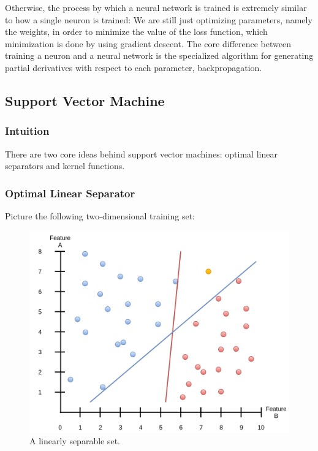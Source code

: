\documentclass[a4paper, 12pt]{article}
\begin{document}
                        \par Otherwise, the process by which a neural network is trained is extremely similar to how a single neuron is trained: We are still just optimizing parameters, namely the weights, in order to minimize the value of the loss function, which minimization is done by using gradient descent. The core difference between training a neuron and a neural network is the specialized algorithm for generating partial derivatives with respect to each parameter, backpropagation.
                        
                      
                \newpage                  
                \subsection{Support Vector Machine}
                
                    \subsubsection{Intuition}
                    
                        \par There are two core ideas behind support vector machines: optimal linear separators and kernel functions.
                        
                    \subsubsection{Optimal Linear Separator}
                    
                        \par Picture the following two-dimensional training set:
                        
                        \begin{figure}[h]
                            \caption{A linearly separable set.}
                            \centering
                            \includegraphics[width=\textwidth]{poorClassifiers}
                        \end{figure}  
                        
\end{document}
